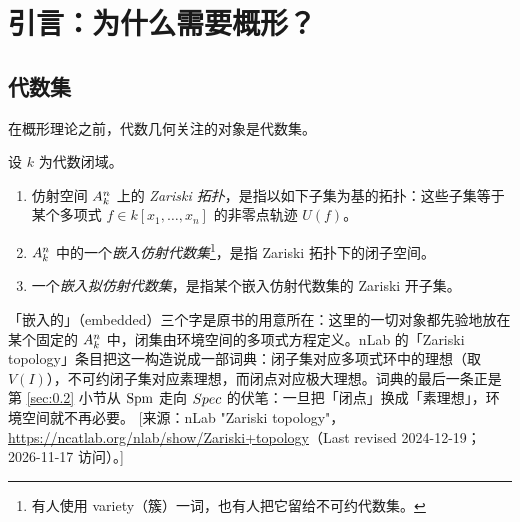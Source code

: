 
\section{引言：为什么需要概形？}\label{sec:0}

\subsection{代数集}\label{sec:0.1}

在概形理论之前，代数几何关注的对象是代数集。

\begin{definition}\label{def:0.1.1}
设 $k$ 为代数闭域。
\begin{enumerate}[label=(\roman*),leftmargin=2em,itemsep=0.25ex]
  \item 仿射空间 $A^n_k$ 上的 \emph{Zariski 拓扑}，是指以如下子集为基的拓扑：这些子集等于某个多项式 $f \in k[x_1,\dots,x_n]$ 的非零点轨迹 $U(f)$。
  \item $A^n_k$ 中的一个\emph{嵌入仿射代数集}\footnote{有人使用 variety（簇）一词，也有人把它留给不可约代数集。}，是指 Zariski 拓扑下的闭子空间。
  \item 一个\emph{嵌入拟仿射代数集}，是指某个嵌入仿射代数集的 Zariski 开子集。
\end{enumerate}
\end{definition}

\begin{yizhu}
「嵌入的」（embedded）三个字是原书的用意所在：这里的一切对象都先验地放在某个固定的 $A^n_k$ 中，闭集由环境空间的多项式方程定义。nLab 的「Zariski topology」条目把这一构造说成一部词典：闭子集对应多项式环中的理想（取 $V(I)$），不可约闭子集对应素理想，而闭点对应极大理想。词典的最后一条正是第 \ref{sec:0.2} 小节从 $\operatorname{Spm}$ 走向 $Spec$ 的伏笔：一旦把「闭点」换成「素理想」，环境空间就不再必要。
[来源：nLab "Zariski topology"，\url{https://ncatlab.org/nlab/show/Zariski+topology}（Last revised 2024-12-19；2026-11-17 访问）。]
\end{yizhu}

